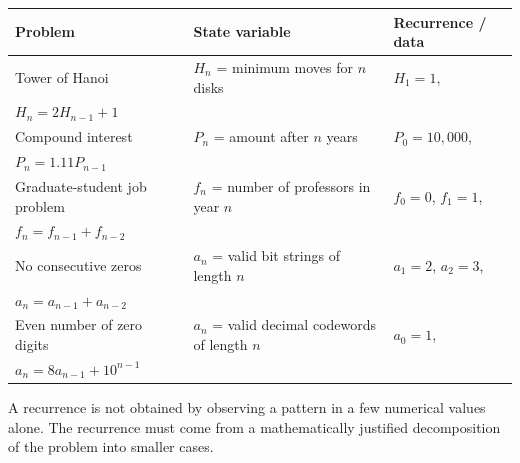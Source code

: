 \begin{center}
\small
\begin{tabular}{@{}p{}p{}p{}@{}}
\toprule
\textbf{Problem} & \textbf{State variable} & \textbf{Recurrence / data} \\
\midrule
Tower of Hanoi & $H_n$ = minimum moves for $n$ disks & $H_1=1$, \\ $H_n=2H_{n-1}+1$ \\
Compound interest & $P_n$ = amount after $n$ years & $P_0=10{,}000$, \\ $P_n=1.11P_{n-1}$ \\
Graduate-student job problem & $f_n$ = number of professors in year $n$ & $f_0=0$, $f_1=1$, \\ $f_n=f_{n-1}+f_{n-2}$ \\
No consecutive zeros & $a_n$ = valid bit strings of length $n$ & $a_1=2$, $a_2=3$, \\ $a_n=a_{n-1}+a_{n-2}$ \\
Even number of zero digits & $a_n$ = valid decimal codewords of length $n$ & $a_0=1$, \\ $a_n=8a_{n-1}+10^{n-1}$ \\
\bottomrule
\end{tabular}
\end{center}

\begin{commonmistake}[title={Final warning for Handout 04}]
A recurrence is not obtained by observing a pattern in a few numerical values alone. The recurrence must come from a mathematically justified decomposition of the problem into smaller cases.
\end{commonmistake}
